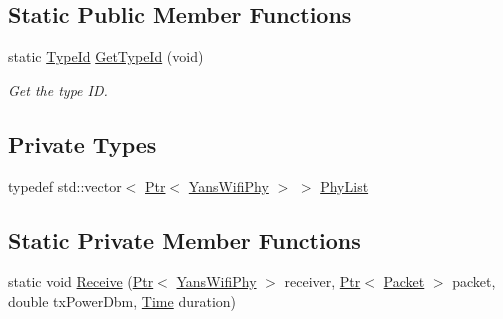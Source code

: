\subsection*{Static Public Member Functions}
\begin{DoxyCompactItemize}
\item 
static \hyperlink{classns3_1_1TypeId}{Type\+Id} \hyperlink{classns3_1_1YansWifiChannel_ac9b84a79195348beaaddafd782681933}{Get\+Type\+Id} (void)
\begin{DoxyCompactList}\small\item\em Get the type ID. \end{DoxyCompactList}\end{DoxyCompactItemize}
\subsection*{Private Types}
\begin{DoxyCompactItemize}
\item 
typedef std\+::vector$<$ \hyperlink{classns3_1_1Ptr}{Ptr}$<$ \hyperlink{classns3_1_1YansWifiPhy}{Yans\+Wifi\+Phy} $>$ $>$ \hyperlink{classns3_1_1YansWifiChannel_a49f4404f431d6221a172f9c6315f8f6a}{Phy\+List}
\end{DoxyCompactItemize}
\subsection*{Static Private Member Functions}
\begin{DoxyCompactItemize}
\item 
static void \hyperlink{classns3_1_1YansWifiChannel_ae35040a088bcae0d43b905ab7f4e02b1}{Receive} (\hyperlink{classns3_1_1Ptr}{Ptr}$<$ \hyperlink{classns3_1_1YansWifiPhy}{Yans\+Wifi\+Phy} $>$ receiver, \hyperlink{classns3_1_1Ptr}{Ptr}$<$ \hyperlink{classns3_1_1Packet}{Packet} $>$ packet, double tx\+Power\+Dbm, \hyperlink{classns3_1_1Time}{Time} duration)
\end{DoxyCompactItemize}
